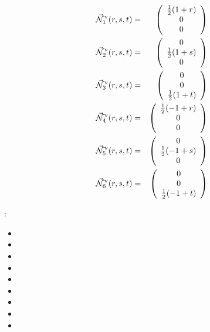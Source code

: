 \begin{mdframed}[backgroundcolor=blue!5]
\begin{eqnarray}
\vec{{\mathcal{N}}}^\upnu_1 (r,s,t) &=& 
\left(\begin{array}{c} \frac12 (1+r) \\ 0 \\ 0\end{array}\right) \nonumber\\
\vec{{\mathcal{N}}}^\upnu_2 (r,s,t) &=& 
\left(\begin{array}{c} 0 \\ \frac12 (1+s) \\0 \end{array}\right) \nonumber\\
\vec{{\mathcal{N}}}^\upnu_3 (r,s,t) &=& 
\left(\begin{array}{c} 0 \\  0 \\\frac12 (1+t)  \end{array}\right) \nonumber\\
\vec{{\mathcal{N}}}^\upnu_4 (r,s,t) &=& 
\left(\begin{array}{c} \frac12 (-1+r) \\ 0 \\ 0 \end{array}\right) \nonumber\\
\vec{{\mathcal{N}}}^\upnu_5 (r,s,t) &=& 
\left(\begin{array}{c} 0 \\ \frac12 (-1+s)  \\ 0 \end{array}\right) \nonumber\\
\vec{{\mathcal{N}}}^\upnu_6 (r,s,t) &=& 
\left(\begin{array}{c} 0 \\ 0 \\\frac12 (-1+t)  \end{array}\right)
\end{eqnarray}
\end{mdframed}



\vspace{1cm}

\Literature: 
\begin{itemize}
\item {} 
\item {} 
\item {} 
\item {}
\item {}
\item {} 
\item {}
\item {} 
\item {}
\end{itemize}
